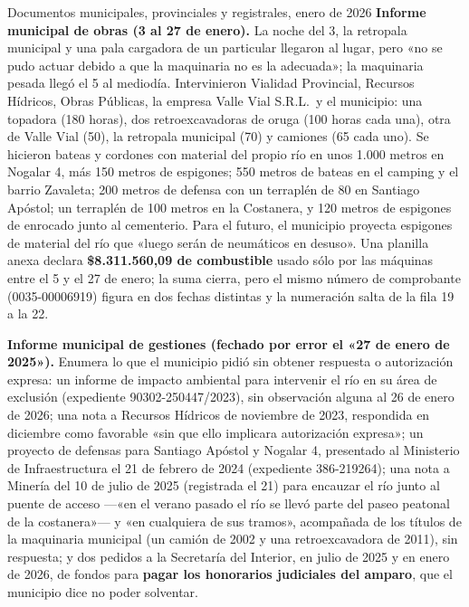 \begin{ficha}{Documentos municipales, provinciales y registrales, enero de 2026}
\textbf{Informe municipal de obras (3 al 27 de enero).} La noche del 3, la retropala municipal y una pala cargadora de un particular llegaron al lugar, pero «no se pudo actuar debido a que la maquinaria no es la adecuada»; la maquinaria pesada llegó el 5 al mediodía. Intervinieron Vialidad Provincial, Recursos Hídricos, Obras Públicas, la empresa Valle Vial S.R.L.\ y el municipio: una topadora (180 horas), dos retroexcavadoras de oruga (100 horas cada una), otra de Valle Vial (50), la retropala municipal (70) y camiones (65 cada uno). Se hicieron bateas y cordones con material del propio río en unos 1.000 metros en Nogalar 4, más 150 metros de espigones; 550 metros de bateas en el camping y el barrio Zavaleta; 200 metros de defensa con un terraplén de 80 en Santiago Apóstol; un terraplén de 100 metros en la Costanera, y 120 metros de espigones de enrocado junto al cementerio. Para el futuro, el municipio proyecta espigones de material del río que «luego serán de neumáticos en desuso». Una planilla anexa declara \textbf{\$8.311.560,09 de combustible} usado sólo por las máquinas entre el 5 y el 27 de enero; la suma cierra, pero el mismo número de comprobante (0035-00006919) figura en dos fechas distintas y la numeración salta de la fila 19 a la 22.

\textbf{Informe municipal de gestiones (fechado por error el «27 de enero de 2025»).} Enumera lo que el municipio pidió sin obtener respuesta o autorización expresa: un informe de impacto ambiental para intervenir el río en su área de exclusión (expediente 90302-250447/2023), sin observación alguna al 26 de enero de 2026; una nota a Recursos Hídricos de noviembre de 2023, respondida en diciembre como favorable «sin que ello implicara autorización expresa»; un proyecto de defensas para Santiago Apóstol y Nogalar 4, presentado al Ministerio de Infraestructura el 21 de febrero de 2024 (expediente 386-219264); una nota a Minería del 10 de julio de 2025 (registrada el 21) para encauzar el río junto al puente de acceso ---«en el verano pasado el río se llevó parte del paseo peatonal de la costanera»--- y «en cualquiera de sus tramos», acompañada de los títulos de la maquinaria municipal (un camión de 2002 y una retroexcavadora de 2011), sin respuesta; y dos pedidos a la Secretaría del Interior, en julio de 2025 y en enero de 2026, de fondos para \textbf{pagar los honorarios judiciales del amparo}, que el municipio dice no poder solventar.


\end{ficha}

